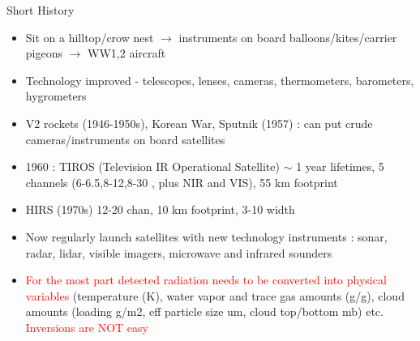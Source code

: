 \documentclass[10pt,t]{beamer}
\begin{document}
\begin{frame}[shrink=2]{Short History}
\begin{block}{}
\begin{itemize}
  \item Sit on a hilltop/crow nest $\rightarrow$ instruments on board balloons/kites/carrier pigeons 
   $\rightarrow$ WW1,2 aircraft
  \item Technology improved - telescopes, lenses, cameras, thermometers, barometers, hygrometers
  \item V2 rockets (1946-1950s), Korean War, Sputnik (1957) : can put crude cameras/instruments on board satellites
  \item 1960 : TIROS (Television IR Operational Satellite) $\sim$ 1 year lifetimes, 5 channels (6-6.5,8-12,8-30 \um, 
         plus NIR and VIS), 55 km footprint
  \item HIRS (1970s) 12-20 chan, 10 km footprint, 3-10 \wn width
  \item Now regularly launch satellites with new technology instruments : sonar, radar, lidar, visible imagers, microwave and infrared sounders
  \item \textcolor{red}{For the most part detected radiation needs to be converted into physical variables}
       (temperature (K), water vapor and trace gas amounts (g/g), cloud amounts (loading g/m2, eff particle size um, 
       cloud top/bottom mb) etc. \textcolor{red}{Inversions are NOT easy}
\end{itemize}  
\end{block}
\end{frame}

\end{document}
